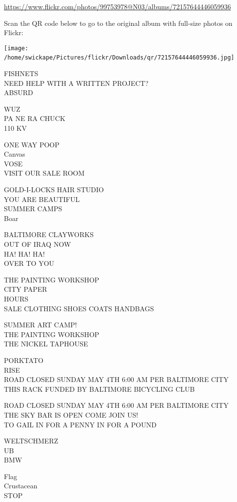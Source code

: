 \documentclass[10pt,letterpaper]{article}
\begin{document}
\url{https://www.flickr.com/photos/99753978@N03/albums/72157644446059936}

Scan the QR code below to go to the original album with full-size photos on Flickr:

\texttt{[image: /home/swickape/Pictures/flickr/Downloads/qr/72157644446059936.jpg]}
\

FISHNETS\\
NEED HELP WITH A WRITTEN PROJECT?\\
ABSURD

WUZ\\
PA NE RA CHUCK\\
110 KV

ONE WAY POOP\\
Canvas\\
VOSE\\
VISIT OUR SALE ROOM

GOLD{-}I{-}LOCKS HAIR STUDIO\\
YOU ARE BEAUTIFUL\\
SUMMER CAMPS\\
Boar

BALTIMORE CLAYWORKS\\
OUT OF IRAQ NOW\\
HA! HA! HA!\\
OVER TO YOU

THE PAINTING WORKSHOP\\
CITY PAPER\\
HOURS\\
SALE CLOTHING SHOES COATS HANDBAGS

SUMMER ART CAMP!\\
THE PAINTING WORKSHOP\\
THE NICKEL TAPHOUSE

PORKTATO\\
RISE\\
ROAD CLOSED SUNDAY MAY 4TH 6:00 AM PER BALTIMORE CITY\\
THIS RACK FUNDED BY BALTIMORE BICYCLING CLUB

ROAD CLOSED SUNDAY MAY 4TH 6:00 AM PER BALTIMORE CITY\\
THE SKY BAR IS OPEN COME JOIN US!\\
TO GAIL IN FOR A PENNY IN FOR A POUND

WELTSCHMERZ\\
UB\\
BMW

Flag\\
Crustacean\\
STOP
\end{document}
